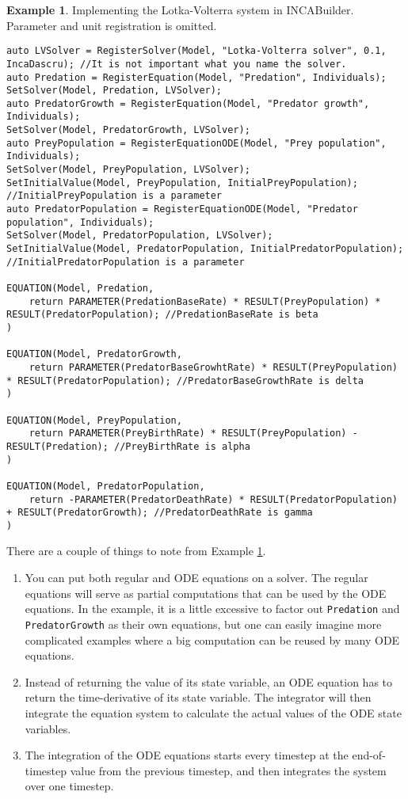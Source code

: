 \documentclass[11pt]{article}
\theoremstyle{definition}
\newtheorem{myexample}{Example}
\newenvironment{example}%
  {\begin{lrbox}{\examplebox}%
   \begin{minipage}{\dimexpr\linewidth-2\fboxsep}
   \begin{myexample}}%
  {\end{myexample}%
   \end{minipage}%
   \end{lrbox}%
   \begin{trivlist}
     \item[]\colorbox{silver}{\usebox\examplebox}
   \end{trivlist}}
\begin{document}
\begin{example}\label{ex:lotkavolterra}
Implementing the Lotka-Volterra system in INCABuilder. Parameter and unit registration is omitted.
\begin{lstlisting}[style=mycpp]
auto LVSolver = RegisterSolver(Model, "Lotka-Volterra solver", 0.1, IncaDascru); //It is not important what you name the solver.
auto Predation = RegisterEquation(Model, "Predation", Individuals);
SetSolver(Model, Predation, LVSolver);
auto PredatorGrowth = RegisterEquation(Model, "Predator growth", Individuals);
SetSolver(Model, PredatorGrowth, LVSolver);
auto PreyPopulation = RegisterEquationODE(Model, "Prey population", Individuals);
SetSolver(Model, PreyPopulation, LVSolver);
SetInitialValue(Model, PreyPopulation, InitialPreyPopulation); //InitialPreyPopulation is a parameter
auto PredatorPopulation = RegisterEquationODE(Model, "Predator population", Individuals);
SetSolver(Model, PredatorPopulation, LVSolver);
SetInitialValue(Model, PredatorPopulation, InitialPredatorPopulation); //InitialPredatorPopulation is a parameter

EQUATION(Model, Predation,
	return PARAMETER(PredationBaseRate) * RESULT(PreyPopulation) * RESULT(PredatorPopulation); //PredationBaseRate is beta
)

EQUATION(Model, PredatorGrowth,
	return PARAMETER(PredatorBaseGrowhtRate) * RESULT(PreyPopulation) * RESULT(PredatorPopulation); //PredatorBaseGrowthRate is delta
)

EQUATION(Model, PreyPopulation,
	return PARAMETER(PreyBirthRate) * RESULT(PreyPopulation) - RESULT(Predation); //PreyBirthRate is alpha
)

EQUATION(Model, PredatorPopulation,
	return -PARAMETER(PredatorDeathRate) * RESULT(PredatorPopulation) + RESULT(PredatorGrowth); //PredatorDeathRate is gamma
)
\end{lstlisting}
\end{example}

There are a couple of things to note from Example \ref{ex:lotkavolterra}.
\begin{enumerate}[i]
\item You can put both regular and ODE equations on a solver. The regular equations will serve as partial computations that can be used by the ODE equations. In the example, it is a little excessive to factor out {\tt Predation} and {\tt PredatorGrowth} as their own equations, but one can easily imagine more complicated examples where a big computation can be reused by many ODE equations.
\item Instead of returning the value of its state variable, an ODE equation has to return the time-derivative of its state variable. The integrator will then integrate the equation system to calculate the actual values of the ODE state variables.
\item The integration of the ODE equations starts every timestep at the end-of-timestep value from the previous timestep, and then integrates the system over one timestep.
\end{enumerate}
\end{document}
